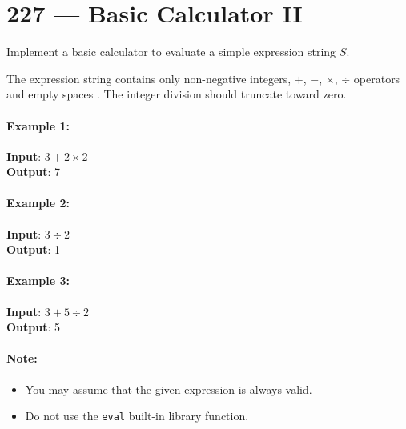 \section{227 --- Basic Calculator II}
Implement a basic calculator to evaluate a simple expression string $S$.
\par
The expression string contains only non-negative integers, $+$, $-$, $\times$, $\div$ operators and empty spaces . The integer division should truncate toward zero.

\paragraph{Example 1:}

\begin{flushleft}
\textbf{Input}: $3+2\times2$
\\
\textbf{Output}: 7
\end{flushleft}

\paragraph{Example 2:}

\begin{flushleft}
\textbf{Input}: $ 3\div2 $
\\
\textbf{Output}: 1
\end{flushleft}

\paragraph{Example 3:}

\begin{flushleft}
\textbf{Input}:  $3+5\div2$
\\
\textbf{Output}: 5
\end{flushleft}

\paragraph{Note:}

\begin{itemize}
\item You may assume that the given expression is always valid.
\item Do not use the \texttt{eval} built-in library function.
\end{itemize}


